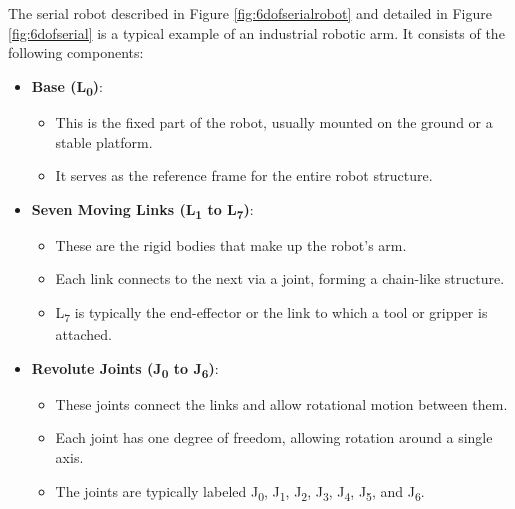 \begin{solution}
    The serial robot described in Figure \ref{fig:6dofserialrobot} and detailed in Figure \ref{fig:6dofserial} is a typical example of an industrial robotic arm. It consists of the following components:

\begin{itemize}
    \item \textbf{Base (L\textsubscript{0})}: 
    \begin{itemize}
        \item This is the fixed part of the robot, usually mounted on the ground or a stable platform.
        \item It serves as the reference frame for the entire robot structure.
    \end{itemize}
    
    \item \textbf{Seven Moving Links (L\textsubscript{1} to L\textsubscript{7})}:
    \begin{itemize}
        \item These are the rigid bodies that make up the robot's arm.
        \item Each link connects to the next via a joint, forming a chain-like structure.
        \item L\textsubscript{7} is typically the end-effector or the link to which a tool or gripper is attached.
    \end{itemize}
    
    \item \textbf{Revolute Joints (J\textsubscript{0} to J\textsubscript{6})}:
    \begin{itemize}
        \item These joints connect the links and allow rotational motion between them.
        \item Each joint has one degree of freedom, allowing rotation around a single axis.
        \item The joints are typically labeled J\textsubscript{0}, J\textsubscript{1}, J\textsubscript{2}, J\textsubscript{3}, J\textsubscript{4}, J\textsubscript{5}, and J\textsubscript{6}.
    \end{itemize}
    

\end{itemize}
\end{solution}
